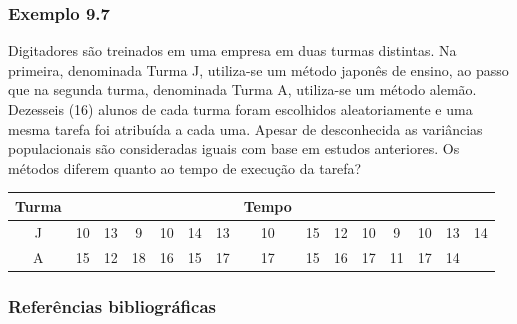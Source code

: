 \documentclass[11pt]{beamer}
\begin{document}
\begin{frame}
\frametitle{Exemplo 9.7}
Digitadores são treinados em uma empresa em duas turmas distintas. Na primeira, denominada Turma J, utiliza-se um método japonês de ensino, ao passo que na segunda turma, denominada Turma A, utiliza-se um método alemão. Dezesseis (16) alunos de cada turma foram escolhidos aleatoriamente e uma mesma tarefa foi atribuída a cada uma. Apesar de desconhecida as variâncias populacionais são consideradas iguais com base em estudos anteriores. Os métodos diferem quanto ao tempo de execução da tarefa? 

\begin{table}[h]
\tiny
\centering
\begin{tabular}{ccccccccccccccc}
\hline
Turma &  &  &  &  &  &  & Tempo &  &  &  &  &  &  &   \\
\hline
J & 10 & 13 & 9 & 10 & 14 & 13 & 10 & 15 & 12 & 10 & 9 & 10 & 13 & 14 \\
\hline
A & 15 & 12 & 18 & 16 & 15 & 17 & 17 & 15 & 16 & 17 & 11 & 17 & 14 & \\
\hline
\end{tabular}
\end{table}
 
\end{frame}

\begin{frame}
\frametitle{Referências bibliográficas}
\printbibliography
\end{frame}
\end{document}
